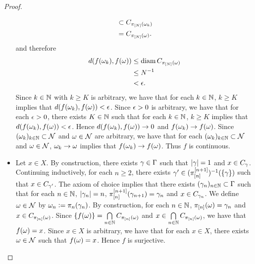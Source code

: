 \documentclass{book}
\begin{document}
\begin{proof}
\begin{itemize}
\begin{align*}
				& \subset C_{\pi_{[N]}(\omega_k)} \\
				& = C_{\pi_{[N]}(\omega)}.
			\end{align*}
			and therefore
			\begin{align*}
				d(f(\omega_k), f(\omega))
				& \leq \operatorname{\text{diam}} C_{\pi_{[N]}(\omega)} \\
				& \leq N^{-1} \\
				& < \epsilon.
			\end{align*}
			Since $k \in \mathbb{N}$ with $k \geq K$ is arbitrary, we have that for each $k \in \mathbb{N}$, $k \geq K$ implies that $d(f(\omega_k), f(\omega)) < \epsilon$. Since $\epsilon > 0$ is arbitrary, we have that for each $\epsilon >0$, there exists $K \in \mathbb{N}$ such that for each $k \in \mathbb{N}$, $k \geq K$ implies that $d(f(\omega_k), f(\omega)) < \epsilon$. Hence $d(f(\omega_k), f(\omega)) \rightarrow 0$ and $f(\omega_k) \rightarrow f(\omega)$. Since $(\omega_k)_{k \in \mathbb{N}} \subset \mathcal{N}$ and $\omega \in \mathcal{N}$ are arbitrary, we have that for each $(\omega_k)_{k \in \mathbb{N}} \subset \mathcal{N}$ and $\omega \in \mathcal{N}$, $\omega_k \rightarrow \omega$ implies that $f(\omega_k) \rightarrow f(\omega)$. Thus $f$ is continuous. 
			\item Let $x \in X$. By construction, there exists $\gamma \in \Gamma$ such that $|\gamma| = 1$ and $x \in C_{\gamma}$. Continuing inductively, for each $n \geq 2$, there exists $\gamma' \in (\pi^{[n+1]}_{[n]})^{-1}(\{\gamma\})$ such that $x \in C_{\gamma'}$. The axiom of choice implies that there exists $(\gamma_n)_{n \in \mathbb{N}} \subset \Gamma$ such that for each $n \in \mathbb{N}$, $|\gamma_n| = n$, $\pi^{[n+1]}_{[n]}(\gamma_{n+1}) = \gamma_n$ and $x \in C_{\gamma_n}$. We define $\omega \in \mathcal{N}$ by $\omega_n \vcentcolon= \pi_n(\gamma_n)$. By construction, for each $n \in \mathbb{N}$, $\pi_{[n]}(\omega) = \gamma_n$ and $x \in C_{\pi_{[n]}(\omega)}$. Since $\{f(\omega)\} = \bigcap\limits_{n \in \mathbb{N}} C_{\pi_{[n]}(\omega)}$ and $x \in \bigcap\limits_{n \in \mathbb{N}} C_{\pi_{[n]}(\omega)}$, we have that $f(\omega) = x$. Since $x \in X$ is arbitrary, we have that for each $x \in X$, there exists $\omega \in \mathcal{N}$ such that $f(\omega) = x$. Hence $f$ is surjective.
		\end{itemize}
	\end{proof}
	
\end{document}
